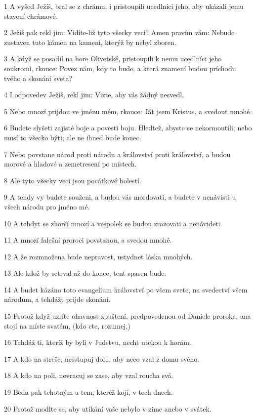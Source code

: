 \par 1 A vyšed Ježíš, bral se z chrámu; i pristoupili ucedlníci jeho, aby ukázali jemu stavení chrámové.
\par 2 Ježíš pak rekl jim: Vidíte-liž tyto všecky veci? Amen pravím vám: Nebude zustaven tuto kámen na kameni, kterýž by nebyl zboren.
\par 3 A když se posadil na hore Olivetské, pristoupili k nemu ucedlníci jeho soukromí, rkouce: Povez nám, kdy to bude, a která znamení budou príchodu tvého a skonání sveta?
\par 4 I odpovedev Ježíš, rekl jim: Vizte, aby vás žádný nesvedl.
\par 5 Nebo mnozí prijdou ve jménu mém, rkouce: Ját jsem Kristus, a svedout mnohé.
\par 6 Budete slyšeti zajisté boje a povesti boju. Hledtež, abyste se nekormoutili; nebo musí to všecko býti; ale ne ihned bude konec.
\par 7 Nebo povstane národ proti národu a království proti království, a budou morové a hladové a zemetresení po místech.
\par 8 Ale tyto všecky veci jsou pocátkové bolestí.
\par 9 A tehdy vy budete souženi, a budou vás mordovati, a budete v nenávisti u všech národu pro jméno mé.
\par 10 A tehdyt se zhorší mnozí a vespolek se budou zrazovati a nenávideti.
\par 11 A mnozí falešní proroci povstanou, a svedou mnohé.
\par 12 A že rozmnožena bude nepravost, ustydnet láska mnohých.
\par 13 Ale kdož by setrval až do konce, tent spasen bude.
\par 14 A budet kázáno toto evangelium království po všem svete, na svedectví všem národum, a tehdážt prijde skonání.
\par 15 Protož když uzríte ohavnost zpuštení, predpovedenou od Daniele proroka, ana stojí na míste svatém, (kdo cte, rozumej,)
\par 16 Tehdáž ti, kteríž by byli v Judstvu, necht utekou k horám.
\par 17 A kdo na streše, nesstupuj dolu, aby neco vzal z domu svého.
\par 18 A kdo na poli, nevracuj se zase, aby vzal roucha svá.
\par 19 Beda pak tehotným a tem, kteréž kojí, v tech dnech.
\par 20 Protož modlte se, aby utíkání vaše nebylo v zime anebo v svátek.
